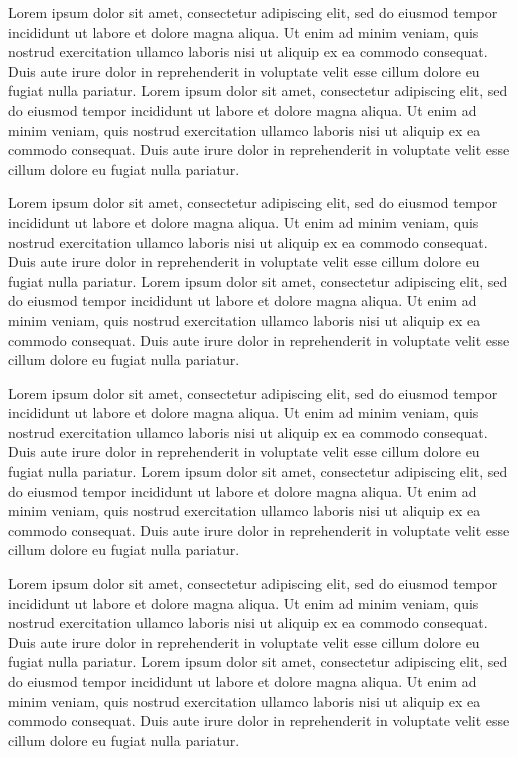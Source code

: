 \documentclass{book}
\begin{document}
Lorem ipsum dolor sit amet, consectetur adipiscing elit, sed do eiusmod tempor incididunt ut labore et dolore magna aliqua. Ut enim ad minim veniam, quis nostrud exercitation ullamco laboris nisi ut aliquip ex ea commodo consequat. Duis aute irure dolor in reprehenderit in voluptate velit esse cillum dolore eu fugiat nulla pariatur. Lorem ipsum dolor sit amet, consectetur adipiscing elit, sed do eiusmod tempor incididunt ut labore et dolore magna aliqua. Ut enim ad minim veniam, quis nostrud exercitation ullamco laboris nisi ut aliquip ex ea commodo consequat. Duis aute irure dolor in reprehenderit in voluptate velit esse cillum dolore eu fugiat nulla pariatur.

Lorem ipsum dolor sit amet, consectetur adipiscing elit, sed do eiusmod tempor incididunt ut labore et dolore magna aliqua. Ut enim ad minim veniam, quis nostrud exercitation ullamco laboris nisi ut aliquip ex ea commodo consequat. Duis aute irure dolor in reprehenderit in voluptate velit esse cillum dolore eu fugiat nulla pariatur. Lorem ipsum dolor sit amet, consectetur adipiscing elit, sed do eiusmod tempor incididunt ut labore et dolore magna aliqua. Ut enim ad minim veniam, quis nostrud exercitation ullamco laboris nisi ut aliquip ex ea commodo consequat. Duis aute irure dolor in reprehenderit in voluptate velit esse cillum dolore eu fugiat nulla pariatur.

Lorem ipsum dolor sit amet, consectetur adipiscing elit, sed do eiusmod tempor incididunt ut labore et dolore magna aliqua. Ut enim ad minim veniam, quis nostrud exercitation ullamco laboris nisi ut aliquip ex ea commodo consequat. Duis aute irure dolor in reprehenderit in voluptate velit esse cillum dolore eu fugiat nulla pariatur. Lorem ipsum dolor sit amet, consectetur adipiscing elit, sed do eiusmod tempor incididunt ut labore et dolore magna aliqua. Ut enim ad minim veniam, quis nostrud exercitation ullamco laboris nisi ut aliquip ex ea commodo consequat. Duis aute irure dolor in reprehenderit in voluptate velit esse cillum dolore eu fugiat nulla pariatur.

Lorem ipsum dolor sit amet, consectetur adipiscing elit, sed do eiusmod tempor incididunt ut labore et dolore magna aliqua. Ut enim ad minim veniam, quis nostrud exercitation ullamco laboris nisi ut aliquip ex ea commodo consequat. Duis aute irure dolor in reprehenderit in voluptate velit esse cillum dolore eu fugiat nulla pariatur. Lorem ipsum dolor sit amet, consectetur adipiscing elit, sed do eiusmod tempor incididunt ut labore et dolore magna aliqua. Ut enim ad minim veniam, quis nostrud exercitation ullamco laboris nisi ut aliquip ex ea commodo consequat. Duis aute irure dolor in reprehenderit in voluptate velit esse cillum dolore eu fugiat nulla pariatur.
\end{document}
